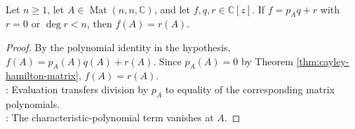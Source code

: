 \begin{corollary} \label{cor:polynomial-reduction-by-characteristic-polynomial} \\
Let $n\geq1$, let $A\in\operatorname{Mat}(n,n,\mathbb{C})$, and let $f,q,r\in\mathbb{C}[z]$. If $f=p_Aq+r$ with $r=0$ or $\deg r<n$, then $f(A)=r(A)$.
\begin{proof}
By the polynomial identity in the hypothesis, $f(A)=p_A(A)q(A)+r(A)$. Since $p_A(A)=0$ by Theorem \ref{thm:cayley-hamilton-matrix}, $f(A)=r(A)$.\\
: Evaluation transfers division by $p_A$ to equality of the corresponding matrix polynomials.\\
: The characteristic-polynomial term vanishes at $A$.
\end{proof}
\end{corollary}

